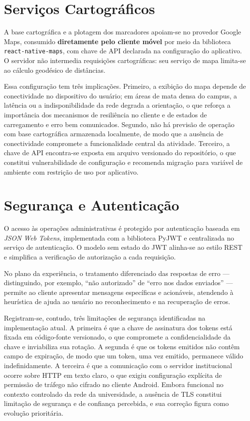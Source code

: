 \section{Serviços Cartográficos}
\label{sec:cartografia}

A base cartográfica e a plotagem dos marcadores apoiam-se no provedor Google Maps,
consumido \textbf{diretamente pelo cliente móvel} por meio da biblioteca
\texttt{react-native-maps}, com chave de API declarada na configuração do
aplicativo. O servidor não intermedia requisições cartográficas: seu serviço de
mapa limita-se ao cálculo geodésico de distâncias.

Essa configuração tem três implicações. Primeiro, a exibição do mapa depende de
conectividade no dispositivo do usuário; em áreas de mata densa do campus, a
latência ou a indisponibilidade da rede degrada a orientação, o que reforça a
importância dos mecanismos de resiliência no cliente e de estados de carregamento
e erro bem comunicados. Segundo, não há previsão de operação com base cartográfica
armazenada localmente, de modo que a ausência de conectividade compromete a
funcionalidade central da atividade. Terceiro, a chave de API encontra-se exposta
em arquivo versionado do repositório, o que constitui vulnerabilidade de
configuração e recomenda migração para variável de ambiente com restrição de uso
por aplicativo.

\section{Segurança e Autenticação}
\label{sec:seguranca}

O acesso às operações administrativas é protegido por autenticação baseada em
\textit{JSON Web Tokens}, implementada com a biblioteca PyJWT e centralizada no
serviço de autenticação. O modelo sem estado do JWT alinha-se ao estilo REST e
simplifica a verificação de autorização a cada requisição.

No plano da experiência, o tratamento diferenciado das respostas de erro ---
distinguindo, por exemplo, ``não autorizado'' de ``erro nos dados enviados'' ---
permite ao cliente apresentar mensagens específicas e acionáveis, atendendo à
heurística de ajuda ao usuário no reconhecimento e na recuperação de erros.

Registram-se, contudo, três limitações de segurança identificadas na
implementação atual. A primeira é que a chave de assinatura dos tokens está
fixada em código-fonte versionado, o que compromete a confidencialidade da chave e
inviabiliza sua rotação. A segunda é que os tokens emitidos não contêm campo de
expiração, de modo que um token, uma vez emitido, permanece válido
indefinidamente. A terceira é que a comunicação com o servidor institucional
ocorre sobre HTTP em texto claro, o que exigiu configuração explícita de
permissão de tráfego não cifrado no cliente Android. Embora funcional no contexto
controlado da rede da universidade, a ausência de TLS constitui limitação de
segurança e de confiança percebida, e sua correção figura como evolução
prioritária.

